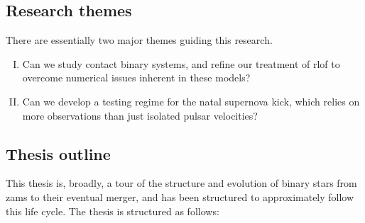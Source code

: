\subsection{Research themes}

There are essentially two major themes guiding this research.

\begin{enumerate}[I.]
	\item Can we study contact binary systems, and refine our treatment of \gls{rlof} to overcome numerical issues inherent in these models?

	\item Can we develop a testing regime for the natal supernova kick, which relies on more observations than just isolated pulsar velocities?
\end{enumerate}

\subsection{Thesis outline}

\alice

This thesis is, broadly, a tour of the structure and evolution of binary stars from \gls{zams} to their eventual merger, and has been structured to approximately follow this life cycle. The thesis is structured as follows:

